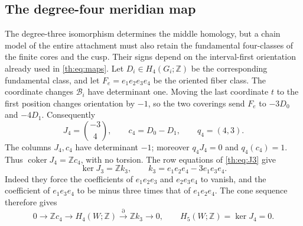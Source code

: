 \subsection{The degree-four meridian map}

The degree-three isomorphism determines the middle homology, but a
chain model of the entire attachment must also retain the fundamental
four-classes of the finite cores and the cusp. Their signs depend on
the interval-first orientation already used in \eqref{th:eq:maps}.
Let $D_i\in H_4(G_i;\mathbb Z)$ be the corresponding fundamental class,
and let $F_e=e_1e_2e_3e_4$ be the oriented fiber class.
The coordinate changes $\mathcal B_i$ have determinant one.
Moving the last coordinate $t$ to the first position changes orientation
by $-1$, so the two coverings send $F_e$ to $-3D_0$ and $-4D_1$.
Consequently
\begin{equation}\label{th:eq:J4}
 J_4=\binom{-3}{4},\qquad
 c_4=D_0-D_1,\qquad q_4=(4,3).
\end{equation}
The columns $J_4,c_4$ have determinant $-1$; moreover
$q_4J_4=0$ and $q_4(c_4)=1$.
Thus $\operatorname{coker}J_4=\mathbb Zc_4$, with no torsion.
The row equations of \eqref{th:eq:J3} give
\[
 \ker J_3=\mathbb Zk_3,\qquad k_3=e_1e_2e_4-3e_1e_3e_4.
\]
Indeed they force the coefficients of $e_1e_2e_3$ and $e_2e_3e_4$
to vanish, and the coefficient of $e_1e_3e_4$ to be minus three times
that of $e_1e_2e_4$. The cone sequence therefore gives
\begin{equation}\label{th:eq:H4-extension}
 0\longrightarrow\mathbb Zc_4\longrightarrow H_4(W;\mathbb Z)
 \xrightarrow{\partial}\mathbb Zk_3\longrightarrow0,
 \qquad H_5(W;\mathbb Z)=\ker J_4=0.
\end{equation}

